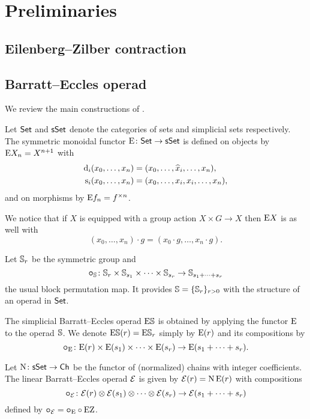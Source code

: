 
\section{Preliminaries}

\subsection{Eilenberg--Zilber contraction}

\TBW

\subsection{Barratt--Eccles operad}

We review the main constructions of \cite{berger2004combinatorial}.

\sssec

Let $\mathsf{Set}$ and $\mathsf{sSet}$ denote the categories of sets and simplicial sets respectively.
The symmetric monoidal functor $\mathrm{E} \colon \mathsf{Set} \to \mathsf{sSet}$ is defined on objects by $\mathrm{E} X_n = X^{n+1}$ with
\[
\begin{split}
	\operatorname{d}_i(x_0,\dots,x_n) &= (x_0,\dots,\widehat{x}_i,\dots,x_n), \\
	\operatorname{s}_i(x_0,\dots,x_n) &= (x_0, \dots, x_i, x_i, \dots, x_n),
\end{split}
\]
and on morphisms by $\mathrm{E} f_n = f^{\times n}$.

We notice that if $X$ is equipped with a group action $X \times G \to X$ then $\mathrm{E} X$ is as well with
\[
(x_0,\dots,x_n) \cdot g = (x_0 \cdot g, \dots, x_n \cdot g).
\]

\sssec

Let $\mathbb{S}_r$ be the symmetric group and
\[
\bm{\circ}_{\mathbb{S}} \colon \mathbb{S}_r \times \mathbb{S}_{s_1} \times \cdots \times \mathbb{S}_{s_r} \to \mathbb{S}_{s_1+\dots+s_r}
\]
the usual block permutation map.
It provides $\mathbb{S} = \{\mathbb{S}_r\}_{r>0}$ with the structure of an operad in $\mathsf{Set}$.

\sssec

The simplicial Barratt--Eccles operad $\mathrm{E}\mathbb{S}$ is obtained by applying the functor $\mathrm{E}$ to the operad $\mathbb{S}$.
We denote $\mathrm{E}\mathbb{S}(r) = \mathrm{E}\mathbb{S}_r$ simply by $\mathrm{E}(r)$ and its compositions by
\[
\bm{\circ}_{\mathrm{E}} \colon \mathrm{E}(r) \times \mathrm{E}(s_1) \times\dots\times \mathrm{E}(s_r) \to \mathrm{E}(s_1+\dots+s_r).
\]

\sssec

Let $\operatorname{N} \colon \mathsf{sSet} \to \mathsf{Ch}$ be the functor of (normalized) chains with integer coefficients.
The linear Barratt--Eccles operad $\mathcal{E}$ is given by $\mathcal{E}(r) = \operatorname{N}\mathrm{E}(r)$ with compositions
\[
\bm{\circ}_{\mathcal{E}} \colon \mathcal{E}(r) \otimes \mathcal{E}(s_1) \otimes\dotsb\otimes \mathcal{E}(s_r) \to \mathcal{E}(s_1+\dots+s_r)
\]
defined by $\bm{\circ}_{\mathcal{E}} = \bm{\circ}_{\mathrm{E}} \circ \operatorname{EZ}$.

